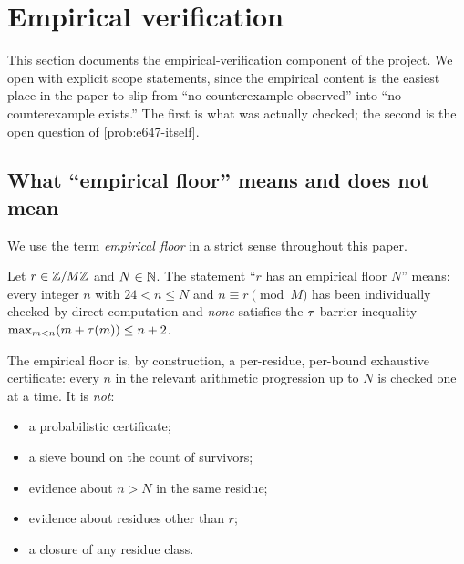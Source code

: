 
\section{Empirical verification}
\label{sec:empirical-detail}

This section documents the empirical-verification component of the
project. We open with explicit scope statements, since the
empirical content is the easiest place in the paper to slip from
``no counterexample observed'' into ``no counterexample exists.''
The first is what was actually checked; the second is the open
question of \cref{prob:e647-itself}.

\subsection{What ``empirical floor'' means and does not mean}
\label{sec:empirical-scope}

We use the term \emph{empirical floor} in a strict sense throughout
this paper.

\begin{definition}
\label{def:empirical-floor}
Let $r \in \mathbb{Z} / M\mathbb{Z}$ and $N \in \mathbb{N}$. The statement
``$r$ has an empirical floor $N$'' means: every integer $n$ with
$24 < n \le N$ and $n \equiv r \pmod M$ has been individually
checked by direct computation and \emph{none} satisfies the
$\tau$-barrier inequality $\max_{m < n}(m + \tau(m)) \le n + 2$.
\end{definition}

The empirical floor is, by construction, a per-residue, per-bound
exhaustive certificate: every $n$ in the relevant arithmetic
progression up to $N$ is checked one at a time. It is \emph{not}:
\begin{itemize}[leftmargin=*]
\item a probabilistic certificate;
\item a sieve bound on the count of survivors;
\item evidence about $n > N$ in the same residue;
\item evidence about residues other than $r$;
\item a closure of any residue class.
\end{itemize}

